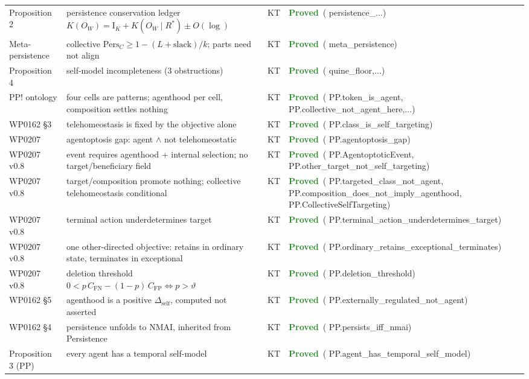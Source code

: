 \documentclass[11pt,a4paper]{article}
\newcommand{\lean}[1]{{\ttfamily\small
  \let\leanunderscore\_\def\_{\leanunderscore\allowbreak}#1}}
\newcommand{\Ik}{\mathrm{I}_K}
\newcommand{\stproved}{\textcolor{ForestGreen}{\textbf{Proved}}}
\begin{document}
{\begin{longtable}{@{}p{2.1cm}p{6.6cm}p{1.0cm}p{2.6cm}@{}}
Proposition 2 & persistence conservation ledger $K(O_W)=\Ik+K(O_W\mid R^\ast)\pm O(\log)$ & KT & \stproved\ (\lean{persistence\_...}) \\
Meta-persistence & collective $\mathrm{Pers}_C\ge 1-(L{+}\mathrm{slack})/k$; parts need not align & KT & \stproved\ (\lean{meta\_persistence}) \\
Proposition 4 & self-model incompleteness (3 obstructions) & KT & \stproved\ (\lean{quine\_floor},$\ldots$) \\
PP! ontology & four cells are patterns; agenthood per cell, composition settles nothing & KT & \stproved\ (\lean{PP.token\_is\_agent}, \lean{PP.collective\_not\_agent\_here},$\ldots$) \\
WP0162 \S3 & telehomeostasis is fixed by the objective alone & KT & \stproved\ (\lean{PP.class\_is\_self\_targeting}) \\
WP0207 & agentoptosis gap: agent $\wedge$ not telehomeostatic & KT & \stproved\ (\lean{PP.agentoptosis\_gap}) \\
WP0207 v0.8 & event requires agenthood + internal selection; no target/beneficiary field & KT & \stproved\ (\lean{PP.AgentoptoticEvent}, \lean{PP.other\_target\_not\_self\_targeting}) \\
WP0207 v0.8 & target/composition promote nothing; collective telehomeostasis conditional & KT & \stproved\ (\lean{PP.targeted\_class\_not\_agent}, \lean{PP.composition\_does\_not\_imply\_agenthood}, \lean{PP.CollectiveSelfTargeting}) \\
WP0207 v0.8 & terminal action underdetermines target & KT & \stproved\ (\lean{PP.terminal\_action\_underdetermines\_target}) \\
WP0207 v0.8 & one other-directed objective: retains in ordinary state, terminates in exceptional & KT & \stproved\ (\lean{PP.ordinary\_retains\_exceptional\_terminates}) \\
WP0207 v0.8 & deletion threshold $0<p\,C_{\mathrm{FN}}-(1-p)\,C_{\mathrm{FP}} \iff p>\vartheta$ & KT & \stproved\ (\lean{PP.deletion\_threshold}) \\
WP0162 \S5 & agenthood is a positive $\Delta_{\mathrm{self}}$, computed not asserted & KT & \stproved\ (\lean{PP.externally\_regulated\_not\_agent}) \\
WP0162 \S4 & persistence unfolds to $\mathrm{NMAI}$, inherited from \lean{Persistence} & KT & \stproved\ (\lean{PP.persists\_iff\_nmai}) \\
Proposition 3 (PP) & every agent has a temporal self-model & KT & \stproved\ (\lean{PP.agent\_has\_temporal\_self\_model}) \\

\end{longtable}}
\end{document}
